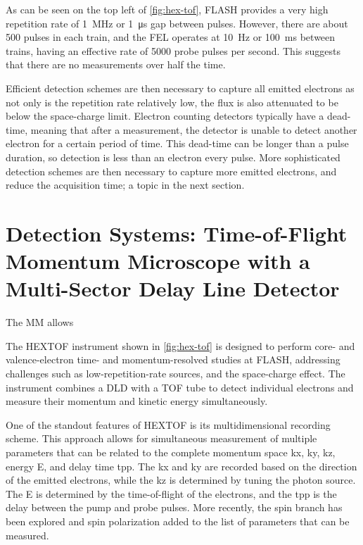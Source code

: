 As can be seen on the top left of \cref{fig:hex-tof}, \gls{FLASH} provides a very high repetition rate of \qty{1}{\mega\hertz} or \qty{1}{\micro\second} gap between \glspl{pulse}. However, there are about 500 pulses in each \gls{train}, and the \gls{FEL} operates at \qty{10}{\Hz} or \qty{100}{\milli\second} between trains, having an effective rate of \num{5000} probe pulses per second. This suggests that there are no measurements over half the time. 

Efficient detection schemes are then necessary to capture all emitted electrons as not only is the repetition rate relatively low, the flux is also attenuated to be below the space-charge limit. Electron counting detectors typically have a dead-time, meaning that after a measurement, the detector is unable to detect another electron for a certain period of time. This dead-time can be longer than a pulse duration, so detection is less than an electron every pulse. More sophisticated detection schemes are then necessary to capture more emitted electrons, and reduce the acquisition time; a topic in the next section.

\section{Detection Systems: Time-of-Flight Momentum Microscope with a Multi-Sector Delay Line Detector}
The \gls{MM} allows 

The \gls{HEXTOF} instrument shown in \cref{fig:hex-tof} is designed to perform core- and valence-electron time- and momentum-resolved studies at \gls{FLASH}, addressing challenges such as low-repetition-rate sources, and the space-charge effect. The instrument combines a \gls{DLD} with a \gls{TOF} tube to detect individual electrons and measure their momentum and kinetic energy simultaneously.

One of the standout features of \gls{HEXTOF} is its multidimensional recording scheme. This approach allows for simultaneous measurement of multiple parameters that can be related to the complete momentum space \gls{kx}, \gls{ky}, \gls{kz}, energy \gls{E}, and delay time \gls{tpp}. The \gls{kx} and \gls{ky} are recorded based on the direction of the emitted electrons, while the \gls{kz} is determined by tuning the photon source. The \gls{E} is determined by the time-of-flight of the electrons, and the \gls{tpp} is the delay between the pump and probe pulses. More recently, the spin branch has been explored and spin polarization added to the list of parameters that can be measured. 


